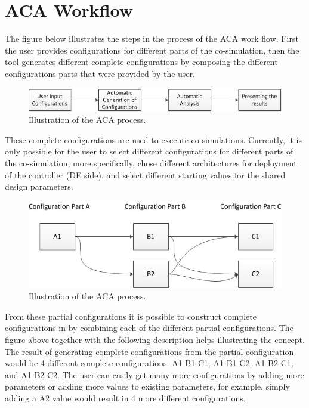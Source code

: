 \documentclass{crescendorepchap}
\begin{document}
\section{ACA Workflow}

The figure below illustrates the steps in the process of the ACA work
flow. First the user provides configurations for different parts of the
co-simulation, then the tool generates different complete configurations
by composing the different configurations parts that were provided by
the user.

\begin{figure}[htbp]
\centering
\includegraphics[width=.6\textwidth]{images/ACAworkflow.jpg}
\caption{Illustration of the ACA process.}
\end{figure}

These complete configurations are used to execute co-simulations. 
Currently, it is only possible for the user to select different
configurations for different parts of the co-simulation, more
specifically, chose different architectures for deployment of the
controller (DE side), and select different starting values for the
shared design parameters.

\begin{figure}[htbp]
\centering
\includegraphics[width=.6\textwidth]{images/ACAconcept.jpg}
\caption{Illustration of the ACA process.}
\end{figure}

From these partial configurations it is possible to construct complete
configurations in by combining each of the different partial
configurations. The figure above together with the following description
helps illustrating the concept. The result of generating complete
configurations from the partial configuration would be 4 different
complete configurations: A1-B1-C1; A1-B1-C2; A1-B2-C1; and A1-B2-C2. The
user can easily get many more configurations by adding more parameters
or adding more values to existing parameters, for example, simply adding
a A2 value would result in 4 more different configurations.
\end{document}
